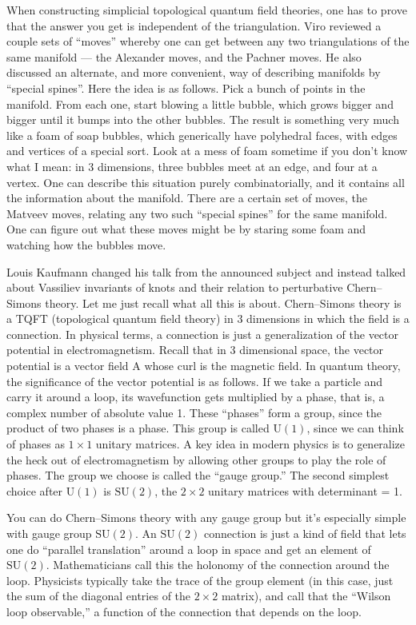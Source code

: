 \documentclass[12pt]{article}
\begin{document}
When constructing simplicial topological quantum field theories, one has
to prove that the answer you get is independent of the triangulation.
Viro reviewed a couple sets of ``moves'' whereby one can get between any
two triangulations of the same manifold --- the Alexander moves, and the
Pachner moves. He also discussed an alternate, and more convenient, way
of describing manifolds by ``special spines''. Here the idea is as
follows. Pick a bunch of points in the manifold. From each one, start
blowing a little bubble, which grows bigger and bigger until it bumps
into the other bubbles. The result is something very much like a foam of
soap bubbles, which generically have polyhedral faces, with edges and
vertices of a special sort. Look at a mess of foam sometime if you don't
know what I mean: in 3 dimensions, three bubbles meet at an edge, and
four at a vertex. One can describe this situation purely
combinatorially, and it contains all the information about the manifold.
There are a certain set of moves, the Matveev moves, relating any two
such ``special spines'' for the same manifold. One can figure out what
these moves might be by staring some foam and watching how the bubbles
move.

Louis Kaufmann changed his talk from the announced subject and instead
talked about Vassiliev invariants of knots and their relation to
perturbative Chern--Simons theory. Let me just recall what all this is
about. Chern--Simons theory is a TQFT (topological quantum field theory)
in 3 dimensions in which the field is a connection. In physical terms, a
connection is just a generalization of the vector potential in
electromagnetism. Recall that in 3 dimensional space, the vector
potential is a vector field A whose curl is the magnetic field. In
quantum theory, the significance of the vector potential is as follows.
If we take a particle and carry it around a loop, its wavefunction gets
multiplied by a phase, that is, a complex number of absolute value 1.
These ``phases'' form a group, since the product of two phases is a
phase. This group is called \(\mathrm{U}(1)\), since we can think of
phases as \(1\times1\) unitary matrices. A key idea in modern physics is
to generalize the heck out of electromagnetism by allowing other groups
to play the role of phases. The group we choose is called the ``gauge
group.'' The second simplest choice after \(\mathrm{U}(1)\) is
\(\mathrm{SU}(2)\), the \(2\times2\) unitary matrices with determinant =
1.

You can do Chern--Simons theory with any gauge group but it's especially
simple with gauge group \(\mathrm{SU}(2)\). An \(\mathrm{SU}(2)\)
connection is just a kind of field that lets one do ``parallel
translation'' around a loop in space and get an element of
\(\mathrm{SU}(2)\). Mathematicians call this the holonomy of the
connection around the loop. Physicists typically take the trace of the
group element (in this case, just the sum of the diagonal entries of the
\(2\times2\) matrix), and call that the ``Wilson loop observable,'' a
function of the connection that depends on the loop.
\end{document}
